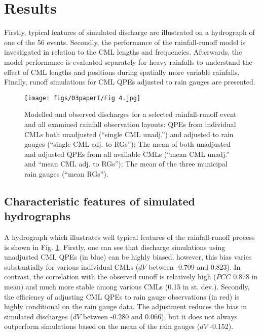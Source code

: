 \documentclass{ctuthesis}\usepackage[]{graphicx}\usepackage[]{color}
\begin{document}
\section{Results} \label{chap5_res}

Firstly, typical features of simulated discharge are illustrated on a hydrograph of one of the 56 events. Secondly, the performance of the rainfall-runoff model is investigated in relation to the CML lengths and frequencies. Afterwards, the model performance is evaluated separately for heavy rainfalls to understand the effect of CML lengths and positions during spatially more variable rainfalls. Finally, runoff simulations for CML QPEs adjusted to rain gauges are presented.


\begin{figure}[H]
\begin{center}
\texttt{[image: figs/03paperI/Fig 4.jpg]}
\caption{Modelled and observed discharges for a selected rainfall-runoff event and all examined rainfall observation layouts: QPEs from individual CMLs both unadjusted (“single CML unadj.”) and adjusted to rain gauges (“single CML adj. to RGs”); The mean of both unadjusted and adjusted QPEs from all available CMLs (“mean CML unadj.” and “mean CML adj. to RGs”); The mean of the three municipal rain gauges (“mean RGs”).} \label{3fig4}
\end{center}
\end{figure}

\subsection{Characteristic features of simulated hydrographs}

A hydrograph which illustrates well typical features of the rainfall-runoff process is shown in Fig. \ref{3fig4}. Firstly, one can see that discharge simulations using unadjusted CML QPEs (in blue) can be highly biased, however, this bias varies substantially for various individual CMLs ($dV$ between -0.709 and 0.823). In contrast, the correlation with the observed runoff is relatively high ($PCC$ 0.878 in mean) and much more stable among various CMLs (0.15 in st. dev.). Secondly, the efficiency of adjusting CML QPEs to rain gauge observations (in red) is highly conditional on the rain gauge data. The adjustment reduces the bias in simulated discharges ($dV$ between -0.280 and 0.066), but it does not always outperform simulations based on the mean of the rain gauges ($dV$ -0.152).
\end{document}
